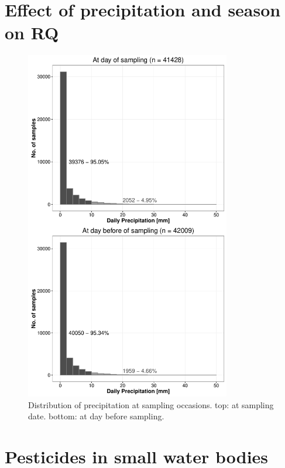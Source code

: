 \documentclass[pdftex,a4paper]{scrreprt}
\begin{document}
\chapter{Effect of precipitation and season on RQ}
\begin{figure}[h]
	\centering
	\includegraphics[width = 0.8\textwidth]{precip}
	\caption{Distribution of precipitation at sampling occasions. top: at sampling date. bottom: at day before sampling.}
	\label{fig:precip}
\end{figure}






\chapter{Pesticides in small water bodies}
\end{document}
